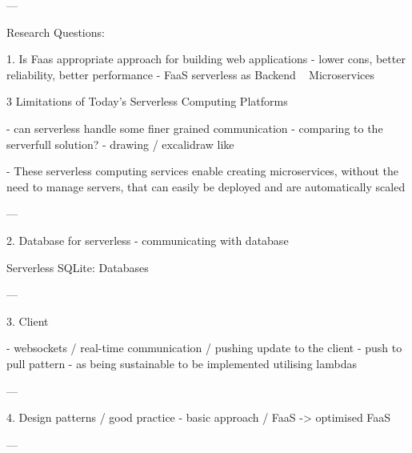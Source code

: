 
---

Research Questions:

1. Is Faas appropriate approach for building web applications - lower cons, better reliability, better performance
- FaaS serverless as Backend ~ Microservices

\cite{BerkeleyServerless}
3 Limitations of Today’s Serverless Computing Platforms

- can serverless handle some finer grained communication - comparing to the serverfull solution? - drawing / excalidraw like

\cite{LeveragingServerlessCloudComputingArchitectures}
- These serverless computing services enable creating microservices, without the need to manage servers, that can easily be deployed and are automatically scaled

---

2. Database for serverless - communicating with database

\cite{BerkeleyServerless}
Serverless SQLite: Databases

---

3. Client

- websockets / real-time communication / pushing update to the client - push to pull pattern - as being sustainable to be implemented utilising lambdas

---

4. Design patterns / good practice
- basic approach / FaaS -> optimised FaaS

---


